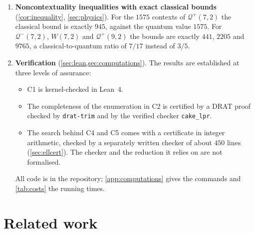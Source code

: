 \documentclass[11pt]{article}
\theoremstyle{definition}
\theoremstyle{remark}
\newcommand{\Qp}{\mathcal{Q}^{+}}
\newcommand{\Qm}{\mathcal{Q}^{-}}
\begin{document}
\begin{enumerate}[label=\textbf{C\arabic*.},leftmargin=*]
Every larger quadric and every $W(2N-1,2)$ with $N\ge4$ has degree at least $\lceil5L/17\rceil$.
So the minimum violated fraction jumps from $1/5$ to $5/17$ once a configuration contains an elliptic $\Qm(7,2)$.
\item \textbf{Noncontextuality inequalities with exact classical bounds} (\cref{cor:inequality}, \cref{sec:physics}).
For the $1575$ contexts of $\Qp(7,2)$ the classical bound is exactly $945$, against the quantum value $1575$.
For $\Qm(7,2)$, $W(7,2)$ and $\Qp(9,2)$ the bounds are exactly $441$, $2205$ and $9765$, a classical-to-quantum ratio of $7/17$ instead of $3/5$.
\item \textbf{Verification} (\cref{sec:lean,sec:computations}).
The results are established at three levels of assurance:
\begin{itemize}[leftmargin=*]
\item C1 is kernel-checked in Lean~4.
\item The completeness of the enumeration in C2 is certified by a DRAT proof checked by \texttt{drat-trim} and by the verified checker \texttt{cake\_lpr}.
\item The search behind C4 and C5 comes with a certificate in integer arithmetic, checked by a separately written checker of about $450$ lines (\cref{sec:ellcert}). The checker and the reduction it relies on are not formalised.
\end{itemize}
All code is in the repository; \cref{app:computations} gives the commands and \cref{tab:costs} the running times.
\end{enumerate}

\section{Related work}\label{sec:related}
\end{document}
